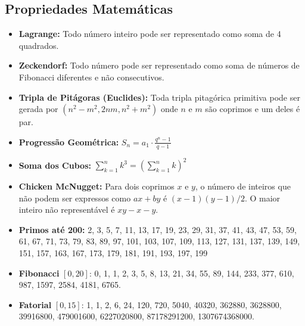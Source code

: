 \subsection{Propriedades Matemáticas}


\begin{small}

\begin{itemize}

    \item \textbf{Lagrange:} Todo número inteiro pode ser representado como soma de 4 quadrados.

    \item \textbf{Zeckendorf:} Todo número pode ser representado como soma de números de Fibonacci diferentes e não consecutivos.

    \item \textbf{Tripla de Pitágoras (Euclides):} Toda tripla pitagórica primitiva pode ser gerada por $(n^2 - m^2, 2nm, n^2 + m^2)$ onde $n$ e $m$ são coprimos e um deles é par.
    
    \item \textbf{Progressão Geométrica:} $S_n = a_1 \cdot \frac{q^n - 1}{q - 1}$

    \item \textbf{Soma dos Cubos:} $\sum_{k=1}^{n} k^3 = \left( \sum_{k=1}^{n} k \right)^2$
    
    \item \textbf{Chicken McNugget:} Para dois coprimos $x$ e $y$, o número de inteiros que não podem ser expressos como $ax + by$ é $(x-1)(y-1)/2$. O maior inteiro não representável é $xy - x - y$.

    \item\textbf{Primos até 200:} 2, 3, 5, 7, 11, 13, 17, 19, 23, 29, 31, 37, 41, 43, 47, 53, 59, 61, 67, 71, 73, 79, 83, 89, 97, 101, 103, 107, 109, 113, 127, 131, 137, 139, 149, 151, 157, 163, 167, 173, 179, 181, 191, 193, 197, 199

    \item\textbf{Fibonacci} $[0,20]$: 
    0, 1, 1, 2, 3, 5, 8, 13, 21, 34, 55, 89, 144, 233, 377, 610, 987, 1597, 2584, 4181, 6765.
    
    \item\textbf{Fatorial} $[0,15]$:
    1, 1, 2, 6, 24, 120, 720, 5040, 40320, 362880, 3628800, 39916800, 479001600, 6227020800, 87178291200, 1307674368000.
    

\end{itemize}
\end{small}
